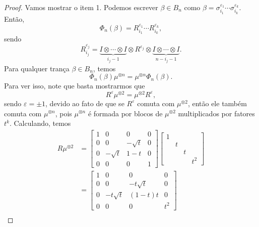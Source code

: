 	\begin{proof}
		Vamos mostrar o item 1. Podemos escrever $\beta\in B_n$ como 
		$\beta = \sigma_{i_1}^{\varepsilon_1}\cdots\sigma_{i_k}^{\varepsilon_k}$. 
		Então,
		\begin{equation*}
		    \Phi_n(\beta) = R_{i_1}^{\varepsilon_1}\cdots R_{i_k}^{\varepsilon_k},
		\end{equation*}
		sendo
		\begin{equation*}
		    R_{i_j}^{\varepsilon_j} 
		    = \underbrace{I\otimes \cdots \otimes I}_{i_j - 1}\otimes R^{\varepsilon_j}
		    \otimes \underbrace{I\otimes \cdots\otimes I}_{n-i_j-1}.
		\end{equation*} 
		Para qualquer trança $\beta\in B_n$, temos
		\begin{equation*}
		    \Phi_n(\beta)\mu^{\otimes n} = \mu^{\otimes n}\Phi_n(\beta).
		\end{equation*}
		Para ver isso, note que basta mostrarmos que
		\begin{equation}
		\label{R mi duas vezes}
		    R^{\varepsilon}\mu^{\otimes 2} = \mu^{\otimes 2}R^{\varepsilon},
		\end{equation}
		sendo $\varepsilon=\pm1$, devido ao fato de que se $R^{\varepsilon}$ comuta 
		com $\mu^{\otimes 2}$, então ele também comuta com $\mu^{\otimes n}$, pois 
		$\mu^{\otimes n}$ é formada por blocos de $\mu^{\otimes 2}$ multiplicados por 
		fatores $t^k$. Calculando, temos
		\begin{align*}
    		R\mu^{\otimes 2} &= \begin{bmatrix}
    		1 & 0 & 0 & 0 \\
    		0 & 0 & -\sqrt{t} & 0 \\
    		0 & -\sqrt{t} & 1-t & 0 \\
    		0 & 0 & 0 & 1
    		\end{bmatrix}\begin{bmatrix}
    		1 \\
    		& t \\
    		& & t \\
    		& & & t^2
    		\end{bmatrix} \\
    		&= \begin{bmatrix}
    		1 & 0 & 0 & 0 \\
    		0 & 0 & -t\sqrt{t} & 0 \\
    		0 & -t\sqrt{t} & (1-t)t &  0 \\
    		0 & 0 & 0 & t^2
    		\end{bmatrix} \\

\end{align*}
\end{proof}
